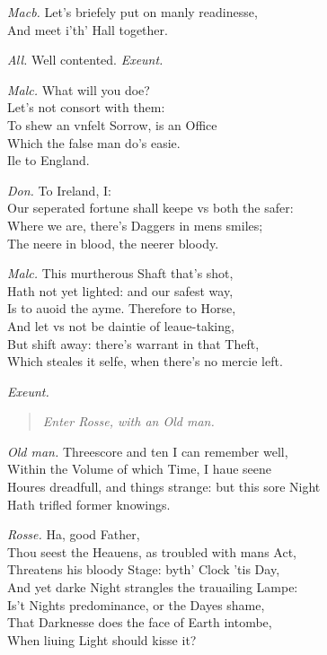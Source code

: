 \documentclass[12pt]{sides}
\newcommand{\StageDir}[1]{\begin{quote}\centering\em #1\end{quote}}
\newcommand{\clStageDir}[1]{\hspace*{\fill}\textit{#1}\hspace*{\fill}}
\newcommand{\elStageDir}[1]{\hfill\textit{#1}}
\newcommand{\dia}[1]{\hskip 15pt\textit{#1}\hskip 6pt}
\begin{document}
\begin{multicols}{2}
            \dia{Macb.} Let's briefely put on manly readinesse, \\ And meet i'th' Hall together.

            \dia{All.} Well contented. \clStageDir{Exeunt.}

            \dia{Malc.} What will you doe? \\ Let's not consort with them: \\ To shew an vnfelt Sorrow, is an Office \\ Which the false man do's easie. \\ Ile to England.

            \dia{Don.} To Ireland, I: \\ Our seperated fortune shall keepe vs both the safer: \\ Where we are, there's Daggers in mens smiles; \\ The neere in blood, the neerer bloody.

            \dia{Malc.} This murtherous Shaft that's shot, \\ Hath not yet lighted: and our safest way, \\ Is to auoid the ayme. Therefore to Horse, \\ And let vs not be daintie of leaue-taking, \\ But shift away: there's warrant in that Theft, \\ Which steales it selfe, when there's no mercie left.

            \elStageDir{Exeunt.} \hspace{72pt}
            \StageDir{Enter Rosse, with an Old man.}
            \dia{Old man.} Threescore and ten I can remember well, \\ Within the Volume of which Time, I haue seene \\ Houres dreadfull, and things strange: but this sore Night \\ Hath trifled former knowings.

            \dia{Rosse.} Ha, good Father, \\ Thou seest the Heauens, as troubled with mans Act, \\ Threatens his bloody Stage: byth' Clock 'tis Day, \\ And yet darke Night strangles the trauailing Lampe: \\ Is't Nights predominance, or the Dayes shame, \\ That Darknesse does the face of Earth intombe, \\ When liuing Light should kisse it?


\end{multicols}
\end{document}
